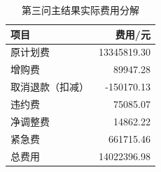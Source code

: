 \begin{table}[htbp]\centering\small
\caption{第三问主结果实际费用分解}
\begin{tabular}{lr}\toprule
项目 & 费用/元\\\midrule
原计划费 & 13345819.30\\
增购费 & 89947.28\\
取消退款（扣减） & -150170.13\\
违约费 & 75085.07\\
净调整费 & 14862.22\\
紧急费 & 661715.46\\
总费用 & 14022396.98\\
\bottomrule\end{tabular}\end{table}
